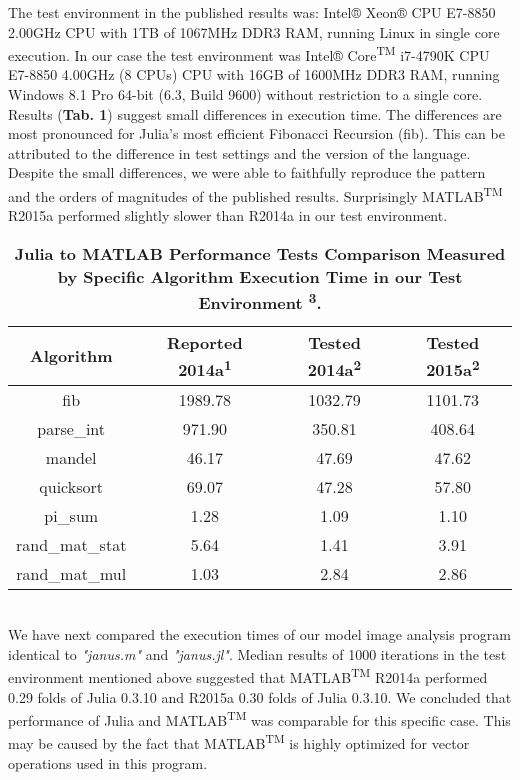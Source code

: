 The test environment in the published results was: Intel® Xeon® CPU E7-8850 2.00GHz CPU with 1TB of 1067MHz DDR3 RAM, running Linux in single core execution. In our case the test environment was Intel® Core\textsuperscript{TM} i7-4790K CPU E7-8850 4.00GHz (8 CPUs) CPU with 16GB of 1600MHz DDR3 RAM, running Windows 8.1 Pro 64-bit (6.3, Build 9600) without restriction to a single core. Results (\textbf{Tab. 1}) suggest small differences in execution time. The differences are most pronounced for Julia's most efficient Fibonacci Recursion (fib). This can be attributed to the difference in test settings and the version of the language. Despite the small differences, we were able to faithfully reproduce the pattern and the orders of magnitudes of the published results. Surprisingly MATLAB\textsuperscript{TM} R2015a performed slightly slower than R2014a in our test environment.

\begin{table} 
    \begin{tabular}{cccc}
    \hline
        \textbf{Algorithm} & \textbf{Reported 2014a\textsuperscript{1}} & \textbf{Tested  2014a\textsuperscript{2}} & \textbf{Tested 2015a\textsuperscript{2}}\\
        \hline
        fib & 1989.78 & 1032.79 & 1101.73 \\ 
        \hline
        parse\_int & 971.90 & 350.81 & 408.64 \\ 
        \hline
        mandel & 46.17 & 47.69 & 47.62 \\ 
        \hline
        quicksort & 69.07 & 47.28 & 57.80 \\ 
        \hline
        pi\_sum & 1.28 & 1.09 & 1.10 \\ 
        \hline
        rand\_mat\_stat & 5.64 & 1.41 & 3.91 \\ 
        \hline
        rand\_mat\_mul & 1.03 & 2.84 & 2.86 \\
        \hline
    \end{tabular}
    \caption{\textbf{Julia to MATLAB Performance Tests Comparison Measured by Specific Algorithm Execution Time in our Test Environment \textsuperscript{3}.}}
\end{table}\\
  
We have next compared the execution times of our model image analysis program identical to \textit{"janus.m"} and \textit{"janus.jl"}. Median results of 1000 iterations in the test environment mentioned above suggested that MATLAB\textsuperscript{TM} R2014a performed 0.29 folds of Julia 0.3.10 and R2015a 0.30 folds of Julia 0.3.10. We concluded that performance of Julia and MATLAB\textsuperscript{TM} was comparable for this specific case. This may be caused by the fact that MATLAB\textsuperscript{TM} is highly optimized for vector operations used in this program.